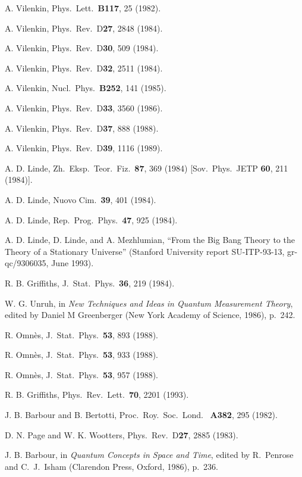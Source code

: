 \begin{thebibliography}{999}
 A. Vilenkin, Phys.\ Lett.\ {\bf B117}, 25 (1982).

 A. Vilenkin, Phys.\ Rev.\ D{\bf 27}, 2848 (1984).

 A. Vilenkin, Phys.\ Rev.\ D{\bf 30}, 509 (1984).

 A. Vilenkin, Phys.\ Rev.\ D{\bf 32}, 2511 (1984).

 A. Vilenkin, Nucl.\ Phys.\ {\bf B252}, 141 (1985).

 A. Vilenkin, Phys.\ Rev.\ D{\bf 33}, 3560 (1986).

 A. Vilenkin, Phys.\ Rev.\ D{\bf 37}, 888 (1988).

 A. Vilenkin, Phys.\ Rev.\ D{\bf 39}, 1116 (1989).

 A. D. Linde, Zh.\ Eksp.\ Teor.\ Fiz.\ {\bf 87}, 369
(1984) [Sov.\ Phys.\ JETP {\bf 60}, 211 (1984)].

 A. D. Linde, Nuovo Cim.\ {\bf 39}, 401 (1984).

 A. D. Linde, Rep.\ Prog.\ Phys.\ {\bf 47}, 925
(1984).

 A. D. Linde, D. Linde, and A. Mezhlumian,
``From the Big Bang Theory to the Theory of a Stationary Universe''
(Stanford University report SU-ITP-93-13, gr-qc/9306035, June 1993).

 R. B. Griffiths, J.\ Stat.\ Phys.\ {\bf 36}, 219
(1984).

 W. G. Unruh, in {\em New Techniques and Ideas
in Quantum Measurement Theory}, edited by Daniel M Greenberger
(New York Academy of Science, 1986), p.~242.

 R. Omn\`{e}s, J.\ Stat.\ Phys.\ {\bf 53}, 893 (1988).

 R. Omn\`{e}s, J.\ Stat.\ Phys.\ {\bf 53}, 933 (1988).

 R. Omn\`{e}s, J.\ Stat.\ Phys.\ {\bf 53}, 957 (1988).

 R. B. Griffiths, Phys.\ Rev.\ Lett.\ {\bf 70}, 2201
(1993).

 J. B. Barbour and B. Bertotti, Proc.\ Roy.\ Soc.\ Lond.\
{\bf
A382}, 295 (1982).

 D. N. Page and W. K. Wootters, Phys.\ Rev.\ D{\bf 27},
2885 (1983).

 J. B. Barbour, in {\em Quantum Concepts in Space and
Time},
edited by
R.~Penrose and C.~J.~Isham (Clarendon Press, Oxford, 1986), p.~236.


\end{thebibliography}
